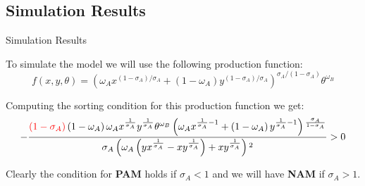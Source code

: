 \documentclass[notes,11pt, aspectratio=169]{beamer}
\newenvironment{wideitemize}{\itemize\addtolength{\itemsep}{10pt}}{\enditemize}
\begin{document}
\subsection{Simulation Results}
\begin{frame}{Simulation Results}
	\begin{wideitemize}
		
		\item{} To simulate the model we will use the following production function:
				\[f(x,y,\theta) = \left(\omega_{A} x^{\left(1-\sigma_{A}\right) / \sigma_{A}}+\left(1-\omega_{A}\right) y^{\left(1-\sigma_{A}\right) / \sigma_{A}}\right)^{\sigma_{A} /\left(1-\sigma_{A}\right)} \theta^{\omega_{B}}\]
		\pause
		\item{}	Computing the sorting condition for this production function we get:
				\begin{equation}
					-\frac{\textcolor{red}{\left(1-\sigma _A\right)} \left(1-\omega _A\right) \omega
					_A x^{\frac{1}{\sigma _A}} y^{\frac{1}{\sigma _A}} \theta
				^{\omega _B} \left(\omega _A x^{\frac{1}{\sigma
				_A}-1}+\left(1-\omega_A\right) y^{\frac{1}{\sigma
				_A}-1}\right){}^{\frac{\sigma _A}{1-\sigma _A}}}{\sigma _A
				\left(\omega _A \left(y x^{\frac{1}{\sigma _A}}-x
				y^{\frac{1}{\sigma _A}}\right)+x y^{\frac{1}{\sigma
				_A}}\right){}^2} > 0
				\end{equation}
			\pause
		\item{} Clearly the condition for \textbf{PAM} holds if $\sigma_A < 1$ and we will have \textbf{NAM} if $\sigma_A > 1$.
	\end{wideitemize}
\end{frame}
\end{document}
